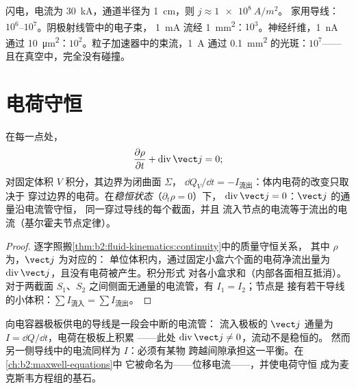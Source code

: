 \begin{example}[数量级]\label{ex:b2:charges-currents-conduction:orders}
闪电，电流为 \qty{30}{kA}，通道半径为 \qty{1}{cm}，则 $j \approx \qty{1e8}{A/m^2}$。
家用导线：$10^6$--$10^7$。阴极射线管中的电子束，
\qty{1}{mA} 流经 \qty{1}{mm^2}：$10^3$。神经纤维，\qty{1}{nA} 通过
\qty{10}{\micro m^2}：$10^2$。粒子加速器中的束流，\qty{1}{A} 通过
\qty{0.1}{mm^2} 的光斑：$10^7$——且在真空中，完全没有碰撞。
\end{example}

\section{电荷守恒}

\begin{theorem}[电荷的局域守恒]\label{thm:b2:charges-currents-conduction:conservation}
在每一点处，
\[
\frac{\partial\rho}{\partial t} + \operatorname{div}\vect j = 0 ;
\]
对固定体积 $V$ 积分，其边界为闭曲面 $\Sigma$，
$\dd Q_V/\dd t = -I_{\text{流出}}$：体内电荷的改变只取决于
穿过边界的电荷。在\emph{稳恒状态}（$\partial_t\rho = 0$）下，
$\operatorname{div}\vect j = 0$：$\vect j$ 的通量沿电流管守恒，
同一穿过导线的每个截面，并且
流入节点的电流等于流出的电流（基尔霍夫节点定律）。
\end{theorem}

\begin{proof}
逐字照搬\cref{thm:b2:fluid-kinematics:continuity}中的质量守恒关系，
其中 $\rho$ 为，$\vect j$ 为对应的：
单位体积内，通过固定小盒六个面的电荷净流出量为
$\operatorname{div}\vect j$，且没有电荷被产生。积分形式
对各小盒求和（内部各面相互抵消）。对于两截面
$S_1$、$S_2$ 之间侧面无通量的电流管，有 $I_1 = I_2$；节点是
接有若干导线的小体积：$\sum I_{\text{流入}} = \sum I_{\text{流出}}$。
\end{proof}

\begin{remark}\label{rem:b2:charges-currents-conduction:capacitor}
向电容器极板供电的导线是一段会中断的电流管：
流入极板的 $\vect j$ 通量为 $I = \dd Q/\dd t$，电荷在极板上积累
——此处 $\operatorname{div}\vect j \ne 0$，流动不是稳恒的。
然而另一侧导线中的电流同样为 $I$：必须有某物
跨越间隙承担这一平衡。在\cref{ch:b2:maxwell-equations}中
它被命名为——位移电流——，并使电荷守恒
成为麦克斯韦方程组的基石。
\end{remark}

